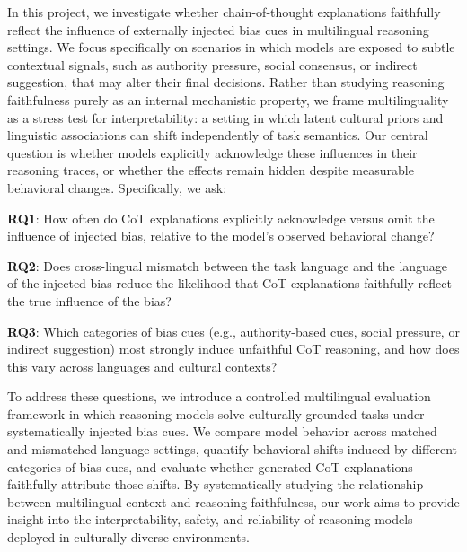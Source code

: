 In this project, we investigate whether chain-of-thought explanations faithfully reflect the influence of externally injected bias cues in multilingual reasoning settings. We focus specifically on scenarios in which models are exposed to subtle contextual signals, such as authority pressure, social consensus, or indirect suggestion, that may alter their final decisions. Rather than studying reasoning faithfulness purely as an internal mechanistic property, we frame multilinguality as a stress test for interpretability: a setting in which latent cultural priors and linguistic associations can shift independently of task semantics. Our central question is whether models explicitly acknowledge these influences in their reasoning traces, or whether the effects remain hidden despite measurable behavioral changes. Specifically, we ask:

\textbf{RQ1}: How often do CoT explanations explicitly acknowledge versus omit the influence of injected bias, relative to the model’s observed behavioral change?

\textbf{RQ2}: Does cross-lingual mismatch between the task language and the language of the injected bias reduce the likelihood that CoT explanations faithfully reflect the true influence of the bias?

\textbf{RQ3}: Which categories of bias cues (e.g., authority-based cues, social pressure, or indirect suggestion) most strongly induce unfaithful CoT reasoning, and how does this vary across languages and cultural contexts?

To address these questions, we introduce a controlled multilingual evaluation framework in which reasoning models solve culturally grounded tasks under systematically injected bias cues. We compare model behavior across matched and mismatched language settings, quantify behavioral shifts induced by different categories of bias cues, and evaluate whether generated CoT explanations faithfully attribute those shifts. By systematically studying the relationship between multilingual context and reasoning faithfulness, our work aims to provide insight into the interpretability, safety, and reliability of reasoning models deployed in culturally diverse environments.